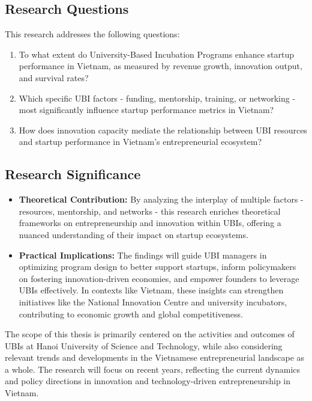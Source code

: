 \documentclass[../Main.tex]{subfiles}
\begin{document}
	\subsection{Research Questions}
	This research addresses the following questions:
	\begin{enumerate}
		\item To what extent do University-Based Incubation Programs enhance startup performance in Vietnam, as measured by revenue growth, innovation output, and survival rates?
		\item Which specific UBI factors - funding, mentorship, training, or networking - most significantly influence startup performance metrics in Vietnam?
		\item How does innovation capacity mediate the relationship between UBI resources and startup performance in Vietnam's entrepreneurial ecosystem?
	\end{enumerate}

	\subsection{Research Significance}
	\begin{itemize}
		\item \textbf{Theoretical Contribution:} By analyzing the interplay of multiple factors - resources, mentorship, and networks - this research enriches theoretical frameworks on entrepreneurship and innovation within UBIs, offering a nuanced understanding of their impact on startup ecosystems.
		\item \textbf{Practical Implications:} The findings will guide UBI managers in optimizing program design to better support startups, inform policymakers on fostering innovation-driven economies, and empower founders to leverage UBIs effectively. In contexts like Vietnam, these insights can strengthen initiatives like the National Innovation Centre and university incubators, contributing to economic growth and global competitiveness.
	\end{itemize}

	\begin{condensed_idea}
		The scope of this thesis is primarily centered on the activities and outcomes of UBIs at Hanoi University of Science and Technology, while also considering relevant trends and developments in the Vietnamese entrepreneurial landscape as a whole. The research will focus on recent years, reflecting the current dynamics and policy directions in innovation and technology-driven entrepreneurship in Vietnam.
	\end{condensed_idea}
\end{document}
